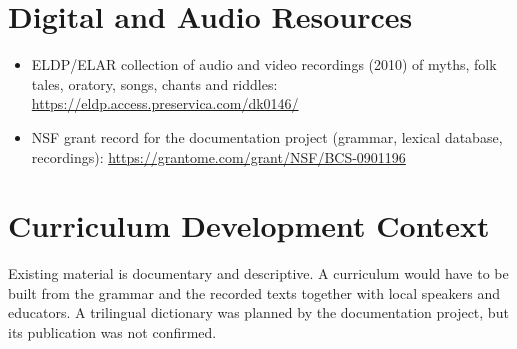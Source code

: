 \documentclass[12pt]{article}
\begin{document}
\section{Digital and Audio Resources}
\begin{itemize}
\item ELDP/ELAR collection of audio and video recordings (2010) of myths, folk tales, oratory, songs, chants and riddles: \url{https://eldp.access.preservica.com/dk0146/}
\item NSF grant record for the documentation project (grammar, lexical database, recordings): \url{https://grantome.com/grant/NSF/BCS-0901196}
\end{itemize}

\section{Curriculum Development Context}
Existing material is documentary and descriptive. A curriculum would have to be built from the grammar and the recorded texts together with local speakers and educators. A trilingual dictionary was planned by the documentation project, but its publication was not confirmed.
\end{document}
